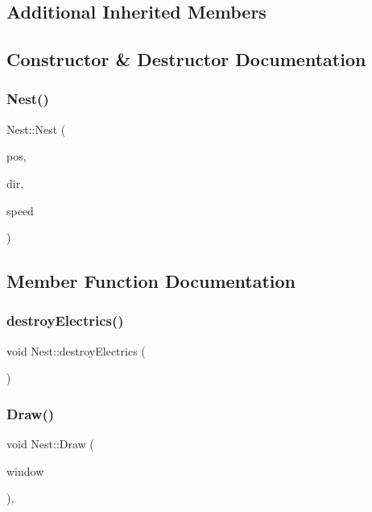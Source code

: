\subsection*{Additional Inherited Members}


\subsection{Constructor \& Destructor Documentation}
\hypertarget{class_nest_a66b6012b3a0d2a9b00ec66cf5d312394}{}\label{class_nest_a66b6012b3a0d2a9b00ec66cf5d312394} 
\subsubsection{\texorpdfstring{Nest()}{Nest()}}
{\footnotesize\ttfamily Nest\+::\+Nest (\begin{DoxyParamCaption}\item[{\hyperlink{class_vector2_d}{Vector2D}}]{pos,  }\item[{\hyperlink{class_vector2_d}{Vector2D}}]{dir,  }\item[{float}]{speed }\end{DoxyParamCaption})}



\subsection{Member Function Documentation}
\hypertarget{class_nest_a22039effa771e65a683e2dd084c04ded}{}\label{class_nest_a22039effa771e65a683e2dd084c04ded} 
\subsubsection{\texorpdfstring{destroy\+Electrics()}{destroyElectrics()}}
{\footnotesize\ttfamily void Nest\+::destroy\+Electrics (\begin{DoxyParamCaption}{ }\end{DoxyParamCaption})}

\hypertarget{class_nest_a5d38f9e047947336dd2830e936ce2386}{}\label{class_nest_a5d38f9e047947336dd2830e936ce2386} 
\subsubsection{\texorpdfstring{Draw()}{Draw()}}
{\footnotesize\ttfamily void Nest\+::\+Draw (\begin{DoxyParamCaption}\item[{sf\+::\+Render\+Window \&}]{window }\end{DoxyParamCaption})\hspace{0.3cm}{\ttfamily [override]}, {\ttfamily [virtual]}}



